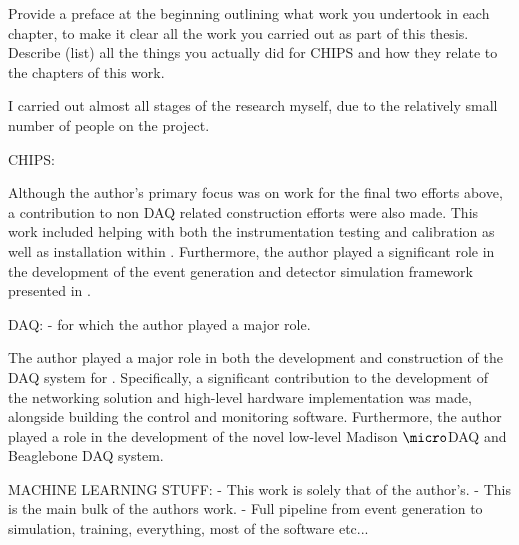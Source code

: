 \begin{preface}
    Provide a preface at the beginning outlining what work you undertook in each chapter, to make
    it clear all the work you carried out as part of this thesis. Describe (list) all the things
    you actually did for CHIPS and how they relate to the chapters of this work.

    I carried out almost all stages of the research myself, due to the relatively small number of
    people on the project.

    CHIPS:

        Although the author's primary focus was on work for the final two efforts above, a
        contribution to non DAQ related \chipsfive construction efforts were also made. This work
        included helping with both the instrumentation testing and calibration as well as
        installation within \chipsfive. Furthermore, the author played a significant role in the
        development of the event generation and detector simulation framework presented in
        .

    DAQ: 
        - for which the author played a major role. 
    
        The author played a major role in both the development and construction of the DAQ system
        for \chipsfive. Specifically, a significant contribution to the development of the
        networking solution and high-level hardware implementation was made, alongside building
        the control and monitoring software. Furthermore, the author played a role in the
        development of the novel low-level Madison $\micro$DAQ and Beaglebone DAQ system.

    MACHINE LEARNING STUFF:
        - This work is solely that of the author's.
        - This is the main bulk of the authors work.
        - Full pipeline from event generation to simulation, training, everything, most of the
        software etc...
\end{preface}

\tableofcontents %